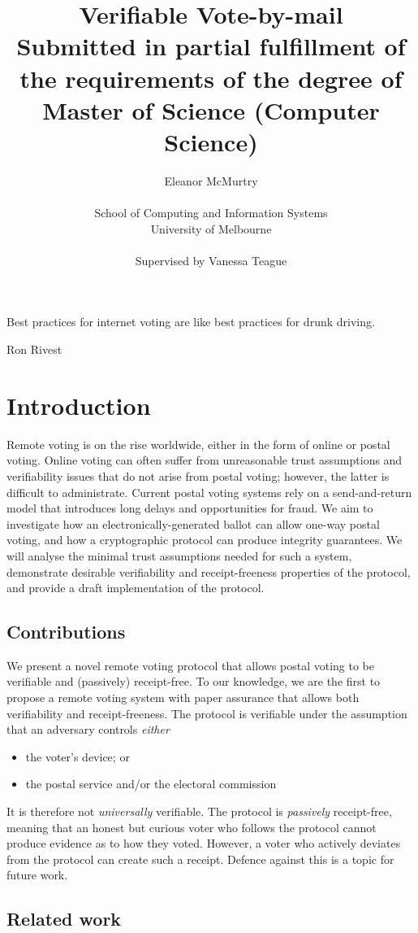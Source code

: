 \documentclass[11pt,twoside,a4paper]{article}
\title{Verifiable Vote-by-mail\\\large Submitted in partial fulfillment of the requirements of the degree of Master of Science (Computer Science)}
\author{Eleanor McMurtry\\\\School of Computing and Information Systems\\University of Melbourne\\\\Supervised by Vanessa Teague}
\theoremstyle{definition}
\begin{document}
\maketitle
\pagebreak
\tableofcontents
\newpage
\epigraph{Best practices for internet voting are like best practices for drunk driving.}{Ron Rivest}
\section{Introduction}
Remote voting is on the rise worldwide, either in the form of online or postal voting. Online voting can often suffer from unreasonable trust assumptions and verifiability issues that do not arise from postal voting; however, the latter is difficult to administrate. Current postal voting systems rely on a send-and-return model that introduces long delays and opportunities for fraud. We aim to investigate how an electronically-generated ballot can allow one-way postal voting, and how a cryptographic protocol can produce integrity guarantees. We will analyse the minimal trust assumptions needed for such a system, demonstrate desirable verifiability and receipt-freeness properties of the protocol, and provide a draft implementation of the protocol.
\subsection{Contributions}
We present a novel remote voting protocol that allows postal voting to be verifiable and (passively) receipt-free. To our knowledge, we are the first to propose a remote voting system with paper assurance that allows both verifiability and receipt-freeness. The protocol is verifiable under the assumption that an adversary controls \textit{either}
\begin{itemize}
    \item the voter's device; or
    \item the postal service and/or the electoral commission
\end{itemize}
It is therefore not \textit{universally} verifiable. The protocol is \textit{passively} receipt-free, meaning that an honest but curious voter who follows the protocol cannot produce evidence as to how they voted. However, a voter who actively deviates from the protocol can create such a receipt. Defence against this is a topic for future work.
\subsection{Related work}
\end{document}
